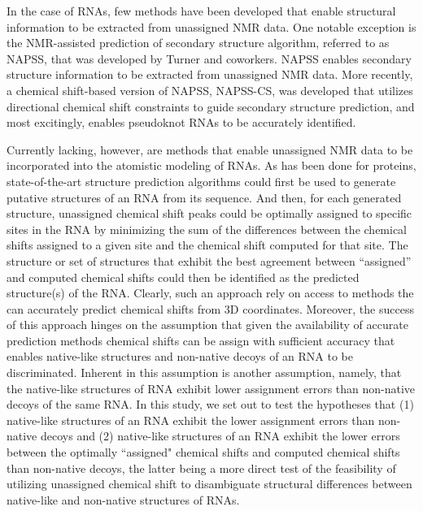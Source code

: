 \documentclass[journal=jcisd8,manuscript=article,layout=onecolumn]{achemso}
\begin{document}
In the case of RNAs, few methods have been developed that enable structural information to be extracted from unassigned NMR data. One notable exception is the NMR-assisted prediction of secondary structure algorithm, referred to as NAPSS, that was  developed by Turner and coworkers. NAPSS enables secondary structure information to be extracted from unassigned NMR data\cite{hart2008nmr}. More recently, a chemical shift-based version of NAPSS, NAPSS-CS, was developed that utilizes directional chemical shift constraints to guide secondary structure prediction, and most excitingly, enables pseudoknot RNAs to be accurately identified\cite{chen2015nuclear}. 

Currently lacking, however, are methods that enable unassigned NMR data to be incorporated into the atomistic modeling of RNAs. As has been done for proteins, state-of-the-art structure prediction algorithms could first be used to generate putative structures of an RNA from its sequence. And then, for each generated structure, unassigned chemical shift peaks could be optimally assigned to specific sites in the RNA by minimizing the sum of the differences between the chemical shifts assigned to a given site and the chemical shift computed for that site. The structure or set of structures that exhibit the best agreement between ``assigned'' and computed chemical shifts could then be identified as the predicted structure(s) of the RNA\cite{meiler2003rapid, bermejo2008deuterated, courtney2015experimental}. Clearly, such an approach rely on access to methods the can accurately predict chemical shifts from 3D coordinates. Moreover, the success of this approach hinges on the assumption that given the availability of accurate prediction methods chemical shifts can be  assign with sufficient accuracy that enables native-like structures and non-native decoys of an RNA to be discriminated. Inherent in this assumption is another assumption, namely, that the native-like structures of RNA exhibit lower assignment errors than non-native decoys of the same RNA. In this study, we set out to test the hypotheses that (1) native-like structures of an RNA exhibit the lower assignment errors than non-native decoys and (2)  native-like structures of an RNA exhibit the lower errors between the optimally ``assigned" chemical shifts and computed chemical shifts than non-native decoys, the latter being a more direct test of the feasibility of utilizing unassigned chemical shift to disambiguate structural differences between native-like and non-native structures of RNAs.
\end{document}
